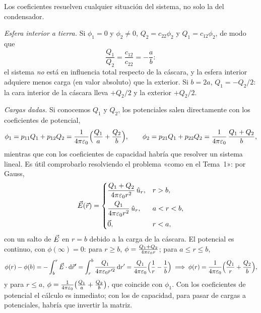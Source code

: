 

\begin{ejemplo}\label{ej:esferico-situaciones}
Los coeficientes resuelven cualquier situación del sistema, no solo la del condensador.

\emph{Esfera interior a tierra.} Si $\phi_1=0$ y $\phi_2\neq0$, $Q_2=c_{22}\phi_2$ y $Q_1=c_{12}\phi_2$, de modo que
\[
  \frac{Q_1}{Q_2}=\frac{c_{12}}{c_{22}}=-\frac{a}{b} :
\]
el sistema \emph{no} está en influencia total respecto de la cáscara, y la esfera interior adquiere menos carga (en valor absoluto) que la exterior. Si
$b=2a$, $Q_1=-Q_2/2$: la cara interior de la cáscara lleva $+Q_2/2$ y la exterior $+Q_2/2$.

\emph{Cargas dadas.} Si conocemos $Q_1$ y $Q_2$, los potenciales salen directamente con los coeficientes de potencial,
\[
  \phi_1=p_{11}Q_1+p_{12}Q_2=\frac{1}{4\pi\varepsilon_{0}}\Bigl(\frac{Q_1}{a}+\frac{Q_2}{b}\Bigr),\qquad
  \phi_2=p_{21}Q_1+p_{22}Q_2=\frac{1}{4\pi\varepsilon_{0}}\,\frac{Q_1+Q_2}{b} ,
\]
mientras que con los coeficientes de capacidad habría que resolver un sistema lineal. Es útil comprobarlo resolviendo el problema «como en el Tema~1»:
por Gauss,
\[
  \vec{E}(\vec{r})=\begin{cases}\dfrac{Q_1+Q_2}{4\pi\varepsilon_{0} r^{2}}\,\hat{u}_{r}, & r>b,\\[8pt] \dfrac{Q_1}{4\pi\varepsilon_{0} r^{2}}\,\hat{u}_{r}, & a<r<b,\\[8pt] \vec{0}, & r<a,\end{cases}
\]
con un salto de $\vec{E}$ en $r=b$ debido a la carga de la cáscara. El potencial es continuo, con $\phi(\infty)=0$: para $r\ge b$,
$\phi=\frac{Q_1+Q_2}{4\pi\varepsilon_{0} r}$; para $a\le r\le b$,
\[
  \phi(r)-\phi(b)=-\int_{b}^{r}\vec{E}\cdot\mathrm{d}\vec{r}'=\int_{r}^{b}\frac{Q_1}{4\pi\varepsilon_{0} r'^{2}}\,\mathrm{d} r'=\frac{Q_1}{4\pi\varepsilon_{0}}\Bigl(\frac1r-\frac1b\Bigr)
  \;\Longrightarrow\;\phi(r)=\frac{1}{4\pi\varepsilon_{0}}\Bigl(\frac{Q_1}{r}+\frac{Q_2}{b}\Bigr),
\]
y para $r\le a$, $\phi=\frac{1}{4\pi\varepsilon_{0}}\bigl(\frac{Q_1}{a}+\frac{Q_2}{b}\bigr)$, que coincide con $\phi_1$. Con los coeficientes de potencial el cálculo es inmediato; con los de
capacidad, para pasar de cargas a potenciales, habría que invertir la matriz.
\end{ejemplo}

